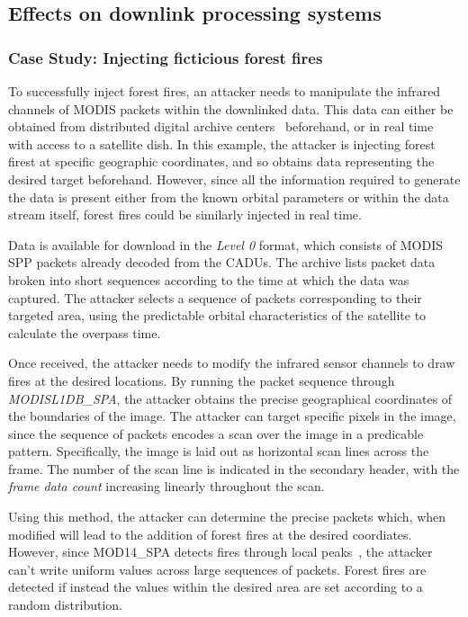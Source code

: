 \subsection{Effects on downlink processing systems}\label{sec:effects-on-processing-systems}

\subsubsection{Case Study: Injecting ficticious forest fires}


To successfully inject forest fires, an attacker needs to manipulate the infrared channels of MODIS packets within the downlinked data.
This data can either be obtained from distributed digital archive centers~\cite{ladsweb} beforehand, or in real time with access to a satellite dish.
In this example, the attacker is injecting forest firest at specific geographic coordinates, and so obtains data representing the desired target beforehand.
However, since all the information required to generate the data is present either from the known orbital parameters or within the data stream itself, forest fires could be similarly injected in real time.

Data is available for download in the \textit{Level 0} format, which consists of MODIS SPP packets already decoded from the CADUs.
The archive lists packet data broken into short sequences according to the time at which the data was captured.
The attacker selects a sequence of packets corresponding to their targeted area, using the predictable orbital characteristics of the satellite to calculate the overpass time.

Once received, the attacker needs to modify the infrared sensor channels to draw fires at the desired locations.
By running the packet sequence through \textit{MODISL1DB\_SPA}, the attacker obtains the precise geographical coordinates of the boundaries of the image.
The attacker can target specific pixels in the image, since the sequence of packets encodes a scan over the image in a predicable pattern.
Specifically, the image is laid out as horizontal scan lines across the frame.
The number of the scan line is indicated in the secondary header, with the \textit{frame data count} increasing linearly throughout the scan.

Using this method, the attacker can determine the precise packets which, when modified will lead to the addition of forest fires at the desired coordiates.
However, since MOD14\_SPA detects fires through local peaks~\cite{mod14Manual}, the attacker can't write uniform values across large sequences of packets.
Forest fires are detected if instead the values within the desired area are set according to a random distribution.

